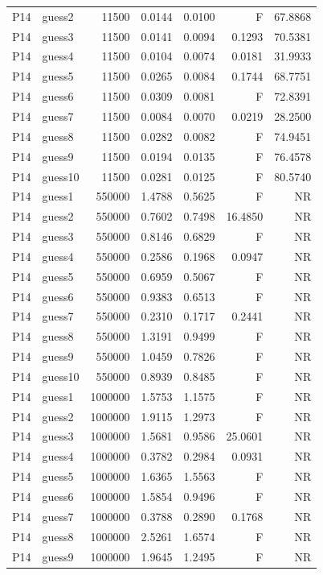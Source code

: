 {\begin{longtable}{llrrrrr}
P14 & guess2 & 11500 & 0.0144 & 0.0100 & F & 67.8868 \\
P14 & guess3 & 11500 & 0.0141 & 0.0094 & 0.1293 & 70.5381 \\
P14 & guess4 & 11500 & 0.0104 & 0.0074 & 0.0181 & 31.9933 \\
P14 & guess5 & 11500 & 0.0265 & 0.0084 & 0.1744 & 68.7751 \\
P14 & guess6 & 11500 & 0.0309 & 0.0081 & F & 72.8391 \\
P14 & guess7 & 11500 & 0.0084 & 0.0070 & 0.0219 & 28.2500 \\
P14 & guess8 & 11500 & 0.0282 & 0.0082 & F & 74.9451 \\
P14 & guess9 & 11500 & 0.0194 & 0.0135 & F & 76.4578 \\
P14 & guess10 & 11500 & 0.0281 & 0.0125 & F & 80.5740 \\
P14 & guess1 & 550000 & 1.4788 & 0.5625 & F & NR \\
P14 & guess2 & 550000 & 0.7602 & 0.7498 & 16.4850 & NR \\
P14 & guess3 & 550000 & 0.8146 & 0.6829 & F & NR \\
P14 & guess4 & 550000 & 0.2586 & 0.1968 & 0.0947 & NR \\
P14 & guess5 & 550000 & 0.6959 & 0.5067 & F & NR \\
P14 & guess6 & 550000 & 0.9383 & 0.6513 & F & NR \\
P14 & guess7 & 550000 & 0.2310 & 0.1717 & 0.2441 & NR \\
P14 & guess8 & 550000 & 1.3191 & 0.9499 & F & NR \\
P14 & guess9 & 550000 & 1.0459 & 0.7826 & F & NR \\
P14 & guess10 & 550000 & 0.8939 & 0.8485 & F & NR \\
P14 & guess1 & 1000000 & 1.5753 & 1.1575 & F & NR \\
P14 & guess2 & 1000000 & 1.9115 & 1.2973 & F & NR \\
P14 & guess3 & 1000000 & 1.5681 & 0.9586 & 25.0601 & NR \\
P14 & guess4 & 1000000 & 0.3782 & 0.2984 & 0.0931 & NR \\
P14 & guess5 & 1000000 & 1.6365 & 1.5563 & F & NR \\
P14 & guess6 & 1000000 & 1.5854 & 0.9496 & F & NR \\
P14 & guess7 & 1000000 & 0.3788 & 0.2890 & 0.1768 & NR \\
P14 & guess8 & 1000000 & 2.5261 & 1.6574 & F & NR \\
P14 & guess9 & 1000000 & 1.9645 & 1.2495 & F & NR \\

\end{longtable}}
